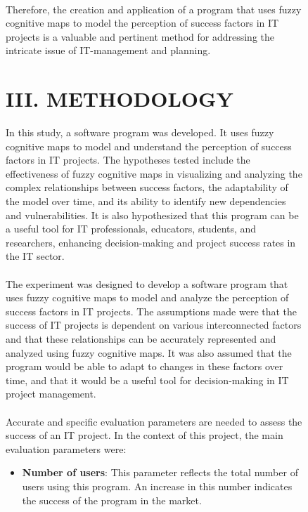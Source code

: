 \documentclass{article}
\begin{document}
    \newpage
    \begin{figure}[!t]
        \fontsize{8}{7}\selectfont
        \begin{minipage}{0.49\textwidth}
            ~\\
            Therefore, the creation and application of a program that uses fuzzy cognitive maps to model the perception of success factors in IT projects is a valuable and pertinent method for addressing the intricate issue of IT-management and planning.\\
            \begin{center}
                \chapter{III. METHODOLOGY}
            \end{center}
            In this study, a software program was developed. It uses fuzzy cognitive maps to model and understand the perception of success factors in IT projects. The hypotheses tested include the effectiveness of fuzzy cognitive maps in visualizing and analyzing the complex relationships between success factors, the adaptability of the model over time, and its ability to identify new dependencies and vulnerabilities. It is also hypothesized that this program can be a useful tool for IT professionals, educators, students, and researchers, enhancing decision-making and project success rates in the IT sector.\\
            ~\\
            The experiment was designed to develop a software program that uses fuzzy cognitive maps to model and analyze the perception of success factors in IT projects. The assumptions made were that the success of IT projects is dependent on various interconnected factors and that these relationships can be accurately represented and analyzed using fuzzy cognitive maps. It was also assumed that the program would be able to adapt to changes in these factors over time, and that it would be a useful tool for decision-making in IT project management.\\
            ~\\
            Accurate and specific evaluation parameters are needed to assess the success of an IT project. In the context of this project, the main evaluation parameters were:
            \begin{itemize}
                \item \textbf{Number of users}: This parameter reflects the total number of users using this program. An increase in this number indicates the success of the program in the market.

\end{itemize}
\end{minipage}
\end{figure}
\end{document}
